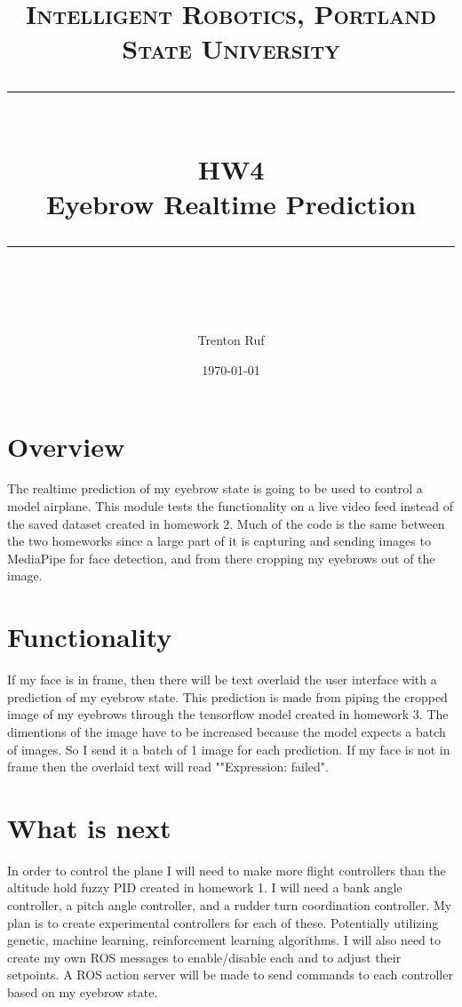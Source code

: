\documentclass[11pt]{scrartcl} %
\title{	
	\normalfont\normalsize
	\textsc{Intelligent Robotics, Portland State University}\\ %
	\vspace{25pt} %
	\rule{\linewidth}{0.5pt}\\ %
	\vspace{20pt} %
	{\huge HW4}\\ %
	\vspace{4pt} %
	{\large Eyebrow Realtime Prediction}\\ %
	\vspace{12pt} %
	\rule{\linewidth}{2pt}\\ %
	\vspace{12pt} %
}
\author{\LARGE Trenton Ruf} %
\date{\normalsize \today} %
\begin{document}
\maketitle %




\renewcommand\thesubsection{\Roman{subsection}}
\section{Overview}
The realtime prediction of my eyebrow state is going to be used to control a model airplane.
This module tests the functionality on a live video feed instead of the saved dataset created in homework 2.
Much of the code is the same between the two homeworks since a large part of it is capturing and sending images to MediaPipe for face detection, 
and from there cropping my eyebrows out of the image.

\section{Functionality}
If my face is in frame, then there will be text overlaid the user interface with a prediction of my eyebrow state. 
This prediction is made from piping the cropped image of my eyebrows through the tensorflow model created in homework 3. 
The dimentions of the image have to be increased because the model expects a batch of images.
So I send it a batch of 1 image for each prediction.
If my face is not in frame then the overlaid text will read ""Expression: failed".


\section{What is next}
In order to control the plane I will need to make more flight controllers than the altitude hold fuzzy PID created in homework 1.
I will need a bank angle controller, a pitch angle controller, and a rudder turn coordination controller. 
My plan is to create experimental controllers for each of these. 
Potentially utilizing genetic, machine learning, reinforcement learning algorithms. 
I will also need to create my own ROS messages to enable/disable each and to adjust their setpoints. 
A ROS action server will be made to send commands to each controller based on my eyebrow state.
\end{document}
